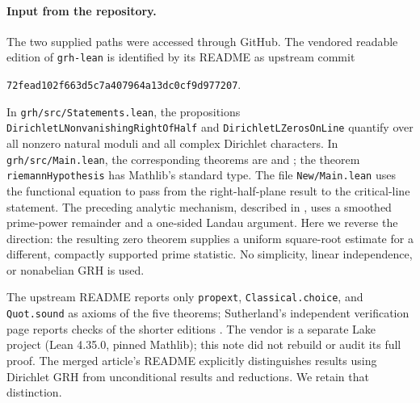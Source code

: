 \documentclass[11pt]{article}
\theoremstyle{remark}\newtheorem{remark}[theorem]{Remark}
\begin{document}
\paragraph{Input from the repository.}
The two supplied paths were accessed through GitHub. The vendored readable edition of \texttt{grh-lean} is identified by its README as upstream commit
\begin{center}\small\texttt{72fead102f663d5c7a407964a13dc0cf9d977207}.\end{center}
In \texttt{grh/src/Statements.lean}, the propositions \texttt{DirichletLNonvanishingRightOfHalf} and \texttt{DirichletLZerosOnLine} quantify over all nonzero natural moduli and all complex Dirichlet characters. In \texttt{grh/src/Main.lean}, the corresponding theorems are  and ; the theorem \texttt{riemannHypothesis} has Mathlib's standard type. The file \texttt{New/Main.lean} uses the functional equation to pass from the right-half-plane result to the critical-line statement. The preceding analytic mechanism, described in , uses a smoothed prime-power remainder and a one-sided Landau argument. Here we reverse the direction: the resulting zero theorem supplies a uniform square-root estimate for a different, compactly supported prime statistic. No simplicity, linear independence, or nonabelian GRH is used.

The upstream README reports only \texttt{propext}, \texttt{Classical.choice}, and \texttt{Quot.sound} as axioms of the five theorems; Sutherland's independent verification page reports checks of the shorter editions \cite{lean,sutherland}. The vendor is a separate Lake project (Lean 4.35.0, pinned Mathlib); this note did not rebuild or audit its full proof. The merged article's README explicitly distinguishes results using Dirichlet GRH from unconditional results and reductions. We retain that distinction.
\end{document}
